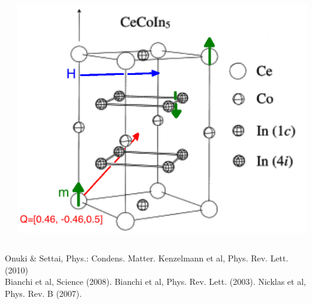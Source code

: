 \documentclass{beamer}
\newcommand\Fontvii{\fontsize{4}{4}\selectfont}
\begin{document}
\begin{frame}
\begin{columns}
\begin{column}{0.5\textwidth}
 
    \end{column}
    \begin{column}{0.5\textwidth}
\includegraphics[scale=0.15]{crystal.png}
    \end{column}
  \end{columns}
  {\Fontvii
     \hspace{5cm} Onuki \& Settai, Phys.: Condens. Matter. Kenzelmann et al, Phys. Rev. Lett. (2010)\\[0.25cm]
 Bianchi et al, Science (2008). Bianchi et al, Phys. Rev. Lett. (2003). Nicklas et al, Phys. Rev. B (2007). \\

  }


\end{frame}
\end{document}
